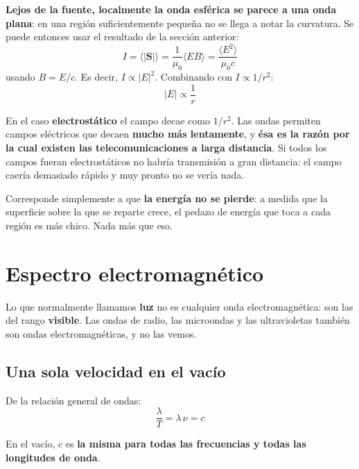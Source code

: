 \documentclass[12pt,a4paper]{article}
\begin{document}
\textbf{Lejos de la fuente, localmente la onda esférica se parece a una onda
plana}: en una región suficientemente pequeña no se llega a notar la curvatura. Se
puede entonces usar el resultado de la sección anterior:
\[
I = \langle|\mathbf{S}|\rangle = \frac{1}{\mu_0}\langle E B\rangle
  = \frac{\langle E^2\rangle}{\mu_0 c}
\]
usando $B = E/c$. Es decir, $I \propto |E|^2$. Combinando con
$I \propto 1/r^2$:
\[
\boxed{\ |E| \propto \frac{1}{r}\ }
\]

\begin{keybox}
En el caso \textbf{electrostático} el campo decae como $1/r^2$. Las ondas permiten
campos eléctricos que decaen \textbf{mucho más lentamente}, y \textbf{ésa es la
razón por la cual existen las telecomunicaciones a larga distancia}. Si todos los
campos fueran electrostáticos no habría transmisión a gran distancia: el campo
caería demasiado rápido y muy pronto no se vería nada.
\end{keybox}

\begin{notebox}
Corresponde simplemente a que \textbf{la energía no se pierde}: a medida que la
superficie sobre la que se reparte crece, el pedazo de energía que toca a cada
región es más chico. Nada más que eso.
\end{notebox}



\section{Espectro electromagnético}

Lo que normalmente llamamos \textbf{luz} no es cualquier onda electromagnética:
son las del rango \textbf{visible}. Las ondas de radio, las microondas y las
ultravioletas también son ondas electromagnéticas, y no las vemos.

\subsection{Una sola velocidad en el vacío}

De la relación general de ondas:
\[
\frac{\lambda}{T} = \lambda\,\nu = c
\]

\begin{keybox}
En el vacío, $c$ es \textbf{la misma para todas las frecuencias y todas las
longitudes de onda}.
\end{keybox}
\end{document}
